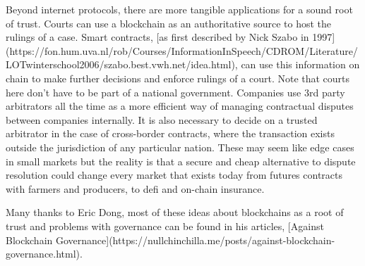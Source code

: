 Beyond internet protocols, there are more tangible applications for a sound root of trust. Courts can use a blockchain as an authoritative source to host the rulings of a case. Smart contracts, [as first described by Nick Szabo in 1997](https://fon.hum.uva.nl/rob/Courses/InformationInSpeech/CDROM/Literature/LOTwinterschool2006/szabo.best.vwh.net/idea.html), can use this information on chain to make further decisions and enforce rulings of a court. Note that courts here don't have to be part of a national government. Companies use 3rd party arbitrators all the time as a more efficient way of managing contractual disputes between companies internally. It is also necessary to decide on a trusted arbitrator in the case of cross-border contracts, where the transaction exists outside the jurisdiction of any particular nation. These may seem like edge cases in small markets but the reality is that a secure and cheap alternative to dispute resolution could change every market that exists today from futures contracts with farmers and producers, to defi and on-chain insurance.

Many thanks to Eric Dong, most of these ideas about blockchains as a root of trust and problems with governance can be found in his articles, [Against Blockchain Governance](https://nullchinchilla.me/posts/against-blockchain-governance.html).
